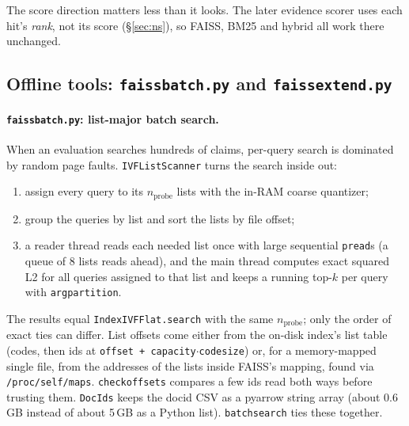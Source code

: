 \documentclass[11pt,a4paper]{article}
\makeatletter
\DeclareRobustCommand{\_}{\ifmmode\nfss@text{\textunderscore}\else\textunderscore\allowbreak\fi}
\newcommand{\file}[1]{\texttt{#1}}
\makeatother
\begin{document}
The score direction matters less than it looks. The later evidence scorer uses each hit's \emph{rank}, not its score
(\S\ref{sec:ns}), so FAISS, BM25 and hybrid all work there unchanged.

\subsection{Offline tools: \file{faiss\_batch.py} and \file{faiss\_extend.py}}

\paragraph{\file{faiss\_batch.py}: list-major batch search.} When an evaluation searches hundreds of claims, per-query
search is dominated by random page faults. \texttt{IVFListScanner} turns the search inside out:
\begin{enumerate}
  \item assign every query to its $n_\text{probe}$ lists with the in-RAM coarse quantizer;
  \item group the queries by list and sort the lists by file offset;
  \item a reader thread reads each needed list once with large sequential \texttt{pread}s (a queue of 8 lists reads
        ahead), and the main thread computes exact squared L2 for all queries assigned to that list and keeps a
        running top-$k$ per query with \texttt{argpartition}.
\end{enumerate}
The results equal \texttt{IndexIVFFlat.search} with the same $n_\text{probe}$; only the order of exact ties can
differ. List offsets come either from the on-disk index's list table (codes, then ids at
\texttt{offset + capacity}$\cdot$\texttt{code\_size}) or, for a memory-mapped single file, from the addresses of the
lists inside FAISS's mapping, found via \file{/proc/self/maps}. \texttt{\_check\_offsets} compares a few ids read
both ways before trusting them. \texttt{DocIds} keeps the docid CSV as a pyarrow string array (about 0.6\,GB instead
of about 5\,GB as a Python list). \texttt{batch\_search} ties these together.
\end{document}
